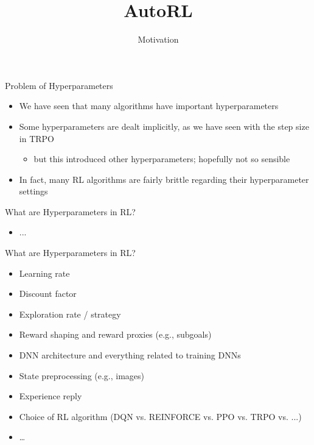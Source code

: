 \documentclass[aspectratio=169]{../latex_main/tntbeamer}  %
\title[Meta-RL]{AutoRL}
\subtitle{Motivation}
\begin{document}
	
	\maketitle



\begin{frame}[c]{Problem of Hyperparameters}
	
	\begin{itemize}
	    \item We have seen that many algorithms have important hyperparameters
	    \item Some hyperparameters are dealt implicitly, as we have seen with the step size in TRPO
	    \begin{itemize}
	        \item but this introduced other hyperparameters; hopefully not so sensible
	    \end{itemize}
	    \item In fact, many RL algorithms are fairly brittle regarding their hyperparameter settings
	\end{itemize}
	
\end{frame}
\begin{frame}[c]{What are Hyperparameters in RL?}
	
	\begin{itemize}
	    \item ...
	\end{itemize}
	
\end{frame}
\begin{frame}[c]{What are Hyperparameters in RL?}
	
	\begin{itemize}
	    \item Learning rate
	    \item Discount factor
	    \item Exploration rate / strategy
	    \item Reward shaping and reward proxies (e.g., subgoals)
	    \item DNN architecture and everything related to training DNNs
	    \item State preprocessing (e.g., images)
	    \item Experience reply
	    \item Choice of RL algorithm (DQN vs. REINFORCE vs. PPO vs. TRPO vs. ...)
	    \item \ldots
	\end{itemize}
	
\end{frame}
\end{document}
